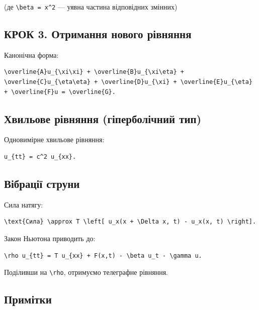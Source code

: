 \documentclass[
  ukrainian,
]{article}
\begin{document}
(де \texttt{\textbackslash{}beta\ =\ x\^{}2} --- уявна частина
відповідних змінних)

\subsection{КРОК 3. Отримання нового
рівняння}\label{ux43aux440ux43eux43a-3.-ux43eux442ux440ux438ux43cux430ux43dux43dux44f-ux43dux43eux432ux43eux433ux43e-ux440ux456ux432ux43dux44fux43dux43dux44f}

Канонічна форма:

\begin{verbatim}
\overline{A}u_{\xi\xi} + \overline{B}u_{\xi\eta} + \overline{C}u_{\eta\eta} + \overline{D}u_{\xi} + \overline{E}u_{\eta} + \overline{F}u = \overline{G}.
\end{verbatim}

\subsection{Хвильове рівняння (гіперболічний
тип)}\label{ux445ux432ux438ux43bux44cux43eux432ux435-ux440ux456ux432ux43dux44fux43dux43dux44f-ux433ux456ux43fux435ux440ux431ux43eux43bux456ux447ux43dux438ux439-ux442ux438ux43f}

Одновимірне хвильове рівняння:

\begin{verbatim}
u_{tt} = c^2 u_{xx}.
\end{verbatim}

\subsection{Вібрації
струни}\label{ux432ux456ux431ux440ux430ux446ux456ux457-ux441ux442ux440ux443ux43dux438}

Сила натягу:

\begin{verbatim}
\text{Сила} \approx T \left[ u_x(x + \Delta x, t) - u_x(x, t) \right].
\end{verbatim}

Закон Ньютона приводить до:

\begin{verbatim}
\rho u_{tt} = T u_{xx} + F(x,t) - \beta u_t - \gamma u.
\end{verbatim}

Поділивши на \texttt{\textbackslash{}rho}, отримуємо телеграфне
рівняння.

\subsection{Примітки}\label{ux43fux440ux438ux43cux456ux442ux43aux438-2}
\end{document}
